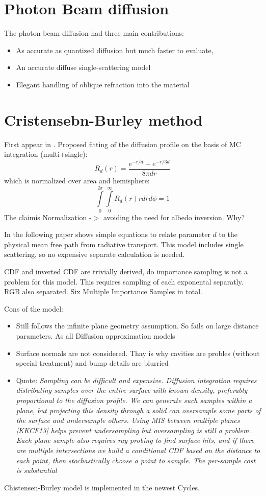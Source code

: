 \section{Photon Beam diffusion}
The photon beam diffusion \cite{Habel:2013:PBD:2600890.2600896} had three main
contributions:
\begin{itemize}
    \item As accurate as quantized diffusion but much faster to evaluate,
    \item An accurate diffuse single-scattering model
    \item Elegant handling of oblique refraction into the material
\end{itemize}

\section{Cristensebn-Burley method}

First appear in \cite{Burley:disney_siggraph15}. Proposed fitting of the
diffusion profile on the basis of MC integration (multi+single):
\[
R_d(r) = \dfrac{e^{-r/d}+e^{-r/3d}}{8\pi dr}
\]
which is normalized over area and hemisphere:
\[
\int\limits_0^{2\pi}\int\limits_0^\infty R_d(r)rdrd\phi = 1
\]
The claimis Normalization -$>$ avoiding the need for albedo inversion. Why?

In the following paper \cite{Christensen:2015:ARP:2775280.2792555} shows simple
equations to relate parameter $d$ to the physical mean free path from radiative
transport. This model includes single scattering, so no expensive separate
calculation is needed.

CDF and inverted CDF are trivially derived, do importance sampling is not a
problem for this model. This requires sampling of each exponental separatly. RGB
also separated. Six Multiple Importance Samples in total.

Cons of the model:
\begin{itemize}
  \item {Still follows the infinite plane geometry assumption. So fails on
  large distance parameters. As all Diffusion approximation models}
  \item {Surface normals are not considered. Thay is why cavities are probles
  (without special treatment) and bump details are blurried}
  \item{Quote: \textit{Sampling can be difficult and expensive. Diffusion
  integration requires distributing samples over the entire surface with known
  density, preferably proportional to the diffusion profile. We can generate
  such samples within a plane, but projecting this density through a solid can
  oversample some parts of the surface and undersample others. Using MIS between
  multiple planes [KKCF13] helps prevent undersampling but oversampling is still
  a problem. Each plane sample also requires ray probing to find surface hits,
  and if there are multiple intersections we build a conditional CDF based on
  the distance to each point, then stochastically choose a point to sample. The
  per-sample cost is substantial}}
\end{itemize}

Chistensen-Burley model is implemented in the newest Cycles.